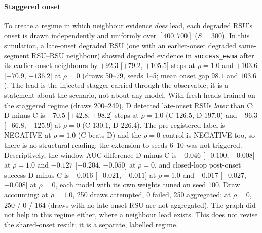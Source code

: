 \paragraph*{Staggered onset}
To create a regime in which neighbour evidence \emph{does} lead, each degraded RSU's onset is drawn independently and uniformly over $[400,700]$ ($S=300$).
In this simulation, a late-onset degraded RSU (one with an earlier-onset degraded same-segment RSU--RSU neighbour) showed degraded evidence in \texttt{success\_ewma} after its earlier-onset neighbours by $+92.3$ [$+79.2$, $+105.5$] steps at $\rho=1.0$ and $+103.6$ [$+70.9$, $+136.2$] at $\rho=0$ (draws 50--79, seeds 1--5; mean onset gap $98.1$ and $103.6$).
The lead is the injected stagger carried through the observable; it is a statement about the scenario, not about any model.
With fresh heads trained on the staggered regime (draws 200--249), D detected late-onset RSUs \emph{later} than C: D minus C is $+70.5$ [$+42.8$, $+98.2$] steps at $\rho=1.0$ (C $126.5$, D $197.0$) and $+96.3$ [$+66.8$, $+125.9$] at $\rho=0$ (C $130.1$, D $226.4$).
The pre-registered label is NEGATIVE at $\rho=1.0$ (C beats D) and the $\rho=0$ control is NEGATIVE too, so there is no structural reading; the extension to seeds 6--10 was not triggered.
Descriptively, the window AUC difference D minus C is $-0.046$ [$-0.100$, $+0.008$] at $\rho=1.0$ and $-0.127$ [$-0.204$, $-0.050$] at $\rho=0$, and closed-loop post-onset success D minus C is $-0.016$ [$-0.021$, $-0.011$] at $\rho=1.0$ and $-0.017$ [$-0.027$, $-0.008$] at $\rho=0$, each model with its own weights tuned on seed 100.
Draw accounting: at $\rho=1.0$, 250 draws attempted, 0 failed, 250 aggregated; at $\rho=0$, 250 / 0 / 164 (draws with no late-onset RSU are not aggregated).
\latcaveat
The graph did not help in this regime either, where a neighbour lead exists.
This does not revise the shared-onset result; it is a separate, labelled regime.

